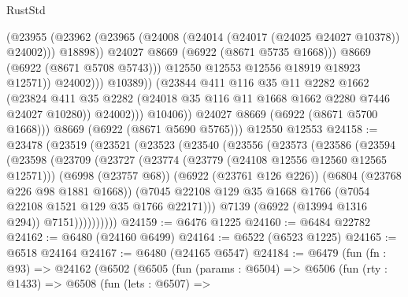 \begin{lexlean}{RustStd}
\begin{coremodule}
                                  (@23955
                                    (@23962
                                      (@23965
                                        (@24008 (@24014 (@24017 (@24025 @24027 @10378)) @24002)))
                                      @18898))
                                  @24027
                                  @8669
                                  (@6922 (@8671 @5735 @1668)))
                                @8669
                                (@6922 (@8671 @5708 @5743)))
                              @12550
                              @12553
                              @12556
                              @18919
                              @18923
                              @12571))
                          @24002)))
                    @10389))
                (@23844
                  @411
                  @116
                  @35
                  @11
                  @2282
                  @1662
                  (@23824
                    @411
                    @35
                    @2282
                    (@24018 @35 @116 @11 @1668 @1662 @2280 @7446 @24027 @10280))
                  @24002)))
            @10406))
        @24027
        @8669
        (@6922 (@8671 @5700 @1668)))
      @8669
      (@6922 (@8671 @5690 @5765)))
    @12550
    @12553
@24158 := @23478
    (@23519
      (@23521
        (@23523
          (@23540
            (@23556
              (@23573
                (@23586
                  (@23594
                    (@23598
                      (@23709
                        (@23727
                          (@23774 (@23779 (@24108 @12556 @12560 @12565 @12571)))
                          (@6998 (@23757 @68))
                          (@6922 (@23761 @126 @226))
                          (@6804 (@23768 @226 @98 @1881 @1668))
                          (@7045
                            @22108
                            @129
                            @35
                            @1668
                            @1766
                            (@7054 @22108 @1521 @129 @35 @1766 @22171)))
                        @7139
                        (@6922 (@13994 @1316 @294))
                        @7151))))))))))
@24159 := @6476 @1225
@24160 := @6484 @22782
@24162 := @6480 (@24160 @6499)
@24164 := @6522 (@6523 @1225)
@24165 := @6518 @24164
@24167 := @6480 (@24165 @6547)
@24184 := @6479
    (fun (fn : @93) =>
    @24162
      (@6502
        (@6505
          (fun (params : @6504) =>
          @6506
            (fun (rty : @1433) =>
            @6508
              (fun (lets : @6507) =>

\end{coremodule}
\end{lexlean}
